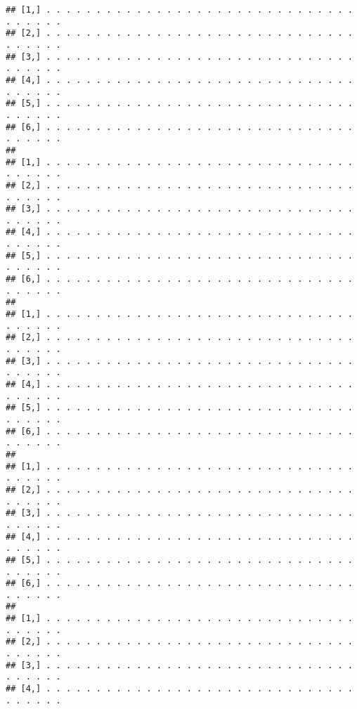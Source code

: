 \documentclass[
]{book}
\begin{document}
\begin{verbatim}
## [1,] . . . . . . . . . . . . . . . . . . . . . . . . . . . . . . . . . . . . .
## [2,] . . . . . . . . . . . . . . . . . . . . . . . . . . . . . . . . . . . . .
## [3,] . . . . . . . . . . . . . . . . . . . . . . . . . . . . . . . . . . . . .
## [4,] . . . . . . . . . . . . . . . . . . . . . . . . . . . . . . . . . . . . .
## [5,] . . . . . . . . . . . . . . . . . . . . . . . . . . . . . . . . . . . . .
## [6,] . . . . . . . . . . . . . . . . . . . . . . . . . . . . . . . . . . . . .
##                                                                               
## [1,] . . . . . . . . . . . . . . . . . . . . . . . . . . . . . . . . . . . . .
## [2,] . . . . . . . . . . . . . . . . . . . . . . . . . . . . . . . . . . . . .
## [3,] . . . . . . . . . . . . . . . . . . . . . . . . . . . . . . . . . . . . .
## [4,] . . . . . . . . . . . . . . . . . . . . . . . . . . . . . . . . . . . . .
## [5,] . . . . . . . . . . . . . . . . . . . . . . . . . . . . . . . . . . . . .
## [6,] . . . . . . . . . . . . . . . . . . . . . . . . . . . . . . . . . . . . .
##                                                                               
## [1,] . . . . . . . . . . . . . . . . . . . . . . . . . . . . . . . . . . . . .
## [2,] . . . . . . . . . . . . . . . . . . . . . . . . . . . . . . . . . . . . .
## [3,] . . . . . . . . . . . . . . . . . . . . . . . . . . . . . . . . . . . . .
## [4,] . . . . . . . . . . . . . . . . . . . . . . . . . . . . . . . . . . . . .
## [5,] . . . . . . . . . . . . . . . . . . . . . . . . . . . . . . . . . . . . .
## [6,] . . . . . . . . . . . . . . . . . . . . . . . . . . . . . . . . . . . . .
##                                                                               
## [1,] . . . . . . . . . . . . . . . . . . . . . . . . . . . . . . . . . . . . .
## [2,] . . . . . . . . . . . . . . . . . . . . . . . . . . . . . . . . . . . . .
## [3,] . . . . . . . . . . . . . . . . . . . . . . . . . . . . . . . . . . . . .
## [4,] . . . . . . . . . . . . . . . . . . . . . . . . . . . . . . . . . . . . .
## [5,] . . . . . . . . . . . . . . . . . . . . . . . . . . . . . . . . . . . . .
## [6,] . . . . . . . . . . . . . . . . . . . . . . . . . . . . . . . . . . . . .
##                                                                               
## [1,] . . . . . . . . . . . . . . . . . . . . . . . . . . . . . . . . . . . . .
## [2,] . . . . . . . . . . . . . . . . . . . . . . . . . . . . . . . . . . . . .
## [3,] . . . . . . . . . . . . . . . . . . . . . . . . . . . . . . . . . . . . .
## [4,] . . . . . . . . . . . . . . . . . . . . . . . . . . . . . . . . . . . . .

\end{verbatim}
\end{document}

